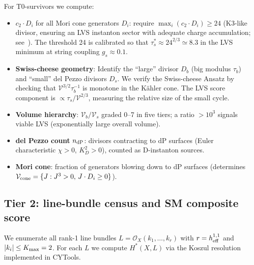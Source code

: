 \documentclass[11pt,a4paper]{article}
\newcommand{\hone}{h^{1,1}}
\newcommand{\cO}{\mathcal{O}}
\begin{document}
For T0-survivors we compute:
\begin{itemize}[noitemsep]
  \item \textbf{$c_2 \cdot D_i$} for all Mori cone generators $D_i$:
    require $\max_i(c_2\cdot D_i) \geq 24$ (K3-like divisor,
    ensuring an LVS instanton sector with adequate charge
    accumulation; see~\cite{Balasubramanian2005}).
    The threshold 24 is calibrated so that $\tau_s^* \approx 24^{2/3}\simeq 8.3$
    in the LVS minimum at string coupling $g_s \approx 0.1$.
  \item \textbf{Swiss-cheese geometry}: Identify the ``large'' divisor
    $D_b$ (big modulus $\tau_b$) and ``small'' del Pezzo divisors
    $D_s$. We verify the Swiss-cheese Ansatz by checking that
    $\mathcal{V}^{3/2}\tau_b^{-1}$ is monotone in the Kähler cone.
    The LVS score component is $\propto \tau_s/\mathcal{V}^{2/3}$,
    measuring the relative size of the small cycle.
  \item \textbf{Volume hierarchy}: $\mathcal{V}_b/\mathcal{V}_s$
    graded 0--7 in five tiers; a ratio $> 10^3$ signals
    viable LVS (exponentially large overall volume).
  \item \textbf{del Pezzo count} $n_{\rm dP}$: divisors contracting
    to dP surfaces (Euler characteristic $\chi > 0$,
    $K_D^2 > 0$), counted as D-instanton sources.
  \item \textbf{Mori cone}: fraction of generators blowing down
    to dP surfaces (determines 
    $\mathcal{V}_{\rm cone} = \{J: J^3 > 0,\, J\cdot D_i \geq 0\}$).
\end{itemize}

\subsection{Tier 2: line-bundle census and SM composite score}
\label{sec:t2}

We enumerate all rank-1 line bundles
$L = \cO_X(k_1,\ldots,k_r)$ with $r = \hone_{\rm eff}$
and $|k_i| \leq K_{\rm max} = 2$.
For each $L$ we compute $H^*(X,L)$ via the Koszul resolution
implemented in CYTools.
\end{document}
